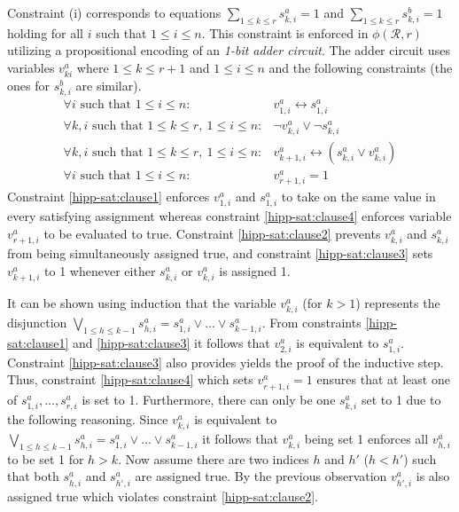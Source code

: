 \documentclass[12pt,a4paper]{article}
\begin{document}
Constraint (i) corresponds to equations $\sum_{1\leq k\leq r} s^a_{k,i} = 1$ and $\sum_{1\leq k\leq r} s^b_{k,i} = 1$ holding for all $i$ such that $1\leq i \leq n$.
This constraint is enforced in $\phi (\mathcal{R}, r)$ utilizing a propositional encoding of an \emph{1-bit adder circuit}.
The adder circuit uses variables $v^a_{ki}$ where $1\leq k \leq r+1$ and $1\leq i\leq n$ and the following constraints (the ones for $s^b_{k,i}$ are similar).
\begin{eqnarray}
\forall i\text{ such that } 1\leq i\leq n: & v^a_{1,i} \leftrightarrow s^a_{1,i}\label{hipp-sat:clause1}\\
\forall k, i\text{ such that } 1\leq k \leq r,\ 1\leq i\leq n: & \neg v^a_{k,i} \vee \neg s^a_{k,i}\label{hipp-sat:clause2}\\
\forall k, i\text{ such that } 1\leq k \leq r,\ 1\leq i\leq n: & v^a_{k+1,i} \leftrightarrow (s^a_{k,i}\vee v^a_{k,i} )\label{hipp-sat:clause3}\\
\forall i\text{ such that } 1\leq i\leq n: & v^a_{r+1,i}=1\label{hipp-sat:clause4}
\end{eqnarray}
Constraint \eqref{hipp-sat:clause1} enforces $v^a_{1,i}$ and $s^a_{1,i}$ to take on the same value in every satisfying assignment whereas constraint \eqref{hipp-sat:clause4} enforces variable $v^a_{r+1,i}$ to be evaluated to true.
Constraint \eqref{hipp-sat:clause2} prevents $v^a_{k,i}$ and $s^a_{k,i}$ from being simultaneously assigned true, 
and constraint \eqref{hipp-sat:clause3} sets $v^a_{k+1,i}$ to 1 whenever either $s^a_{k,i}$ or $v^a_{k,i}$ is assigned 1.

It can be shown using induction that the variable $v^a_{k,i}$ (for $k>1$) represents the disjunction $\bigvee_{1\leq h\leq k-1}s^a_{h,i} = s^a_{1,i}\vee\dots \vee s^a_{k-1,i}$.
From constraints \eqref{hipp-sat:clause1} and \eqref{hipp-sat:clause3} it follows that $v^a_{2,i}$ is equivalent to $s^a_{1,i}$.
Constraint \eqref{hipp-sat:clause3} also provides yields the proof of the inductive step.
Thus, constraint \eqref{hipp-sat:clause4} which sets $v^a_{r+1,i}=1$ ensures that at least one of $s^a_{1,i},\dots , s^a_{r,i}$ is set to 1.
Furthermore, there can only be one $s^a_{k,i}$ set to 1 due to the following reasoning.
Since $v^a_{k,i}$ is equivalent to $\bigvee_{1\leq h\leq k-1}s^a_{h,i} = s^a_{1,i}\vee\dots \vee s^a_{k-1,i}$ it follows that $v^a_{k,i}$ being set 1 enforces all $v^a_{h,i}$ to be set 1 for $h>k$.
Now assume there are two indices $h$ and $h'$ ($h<h'$) such that both $s^a_{h,i}$ and $s^a_{h',i}$ are assigned true.
By the previous observation $v^a_{h',i}$ is also assigned true which violates constraint \eqref{hipp-sat:clause2}.
\end{document}
